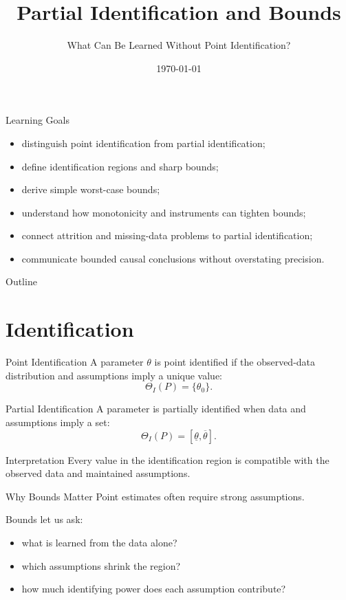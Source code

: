 \documentclass[aspectratio=169,11pt]{beamer}
\title[Partial Identification]{Partial Identification and Bounds}
\subtitle{What Can Be Learned Without Point Identification?}
\date{\today}
\begin{document}
\begin{frame}
\titlepage
\end{frame}

\begin{frame}{Learning Goals}
\begin{itemize}
\item distinguish point identification from partial identification;
\item define identification regions and sharp bounds;
\item derive simple worst-case bounds;
\item understand how monotonicity and instruments can tighten bounds;
\item connect attrition and missing-data problems to partial identification;
\item communicate bounded causal conclusions without overstating precision.
\end{itemize}
\end{frame}

\begin{frame}{Outline}
\tableofcontents
\end{frame}

\section{Identification}

\begin{frame}{Point Identification}
A parameter \(\theta\) is point identified if the observed-data distribution and assumptions imply a unique value:
\[
\Theta_I(P)=\{\theta_0\}.
\]
\end{frame}

\begin{frame}{Partial Identification}
A parameter is partially identified when data and assumptions imply a set:
\[
\Theta_I(P)=[\underline{\theta},\overline{\theta}].
\]

\begin{alertblock}{Interpretation}
Every value in the identification region is compatible with the observed data and maintained assumptions.
\end{alertblock}
\end{frame}

\begin{frame}{Why Bounds Matter}
Point estimates often require strong assumptions.

Bounds let us ask:
\begin{itemize}
\item what is learned from the data alone?
\item which assumptions shrink the region?
\item how much identifying power does each assumption contribute?
\end{itemize}
\end{frame}
\end{document}
